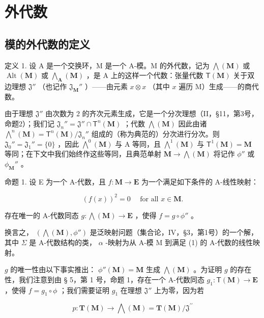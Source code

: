 \section{外代数}

\subsection{模的外代数的定义}

定义 1. 设 A 是一个交换环，M 是一个 A-模。M 的外代数，记为 \(\bigwedge (\mathbf{M})\) 或 \(\operatorname {Alt}(\mathbf{M})\) 或 \(\bigwedge_{\mathbf{A}}(\mathbf{M})\) ，是 A 上的这样一个代数：张量代数 \(\mathsf{T}(\mathbf{M})\) 关于双边理想 \(\mathfrak{J}''\) （也记作 \(\mathfrak{J}_{\mathbf{M}}''\) ）——由元素 \(x\otimes x\) （其中 \(x\) 遍历 M）生成——的商代数。

由于理想 \(\mathfrak{J}''\) 由次数为 2 的齐次元素生成，它是一个分次理想（II，§11，第3号，命题2）；我们记 \(\mathfrak{J}_n'' = \mathfrak{J}'' \cap \mathsf{T}^n(\mathbf{M})\) ；代数 \(\bigwedge(\mathbf{M})\) 因此由诸 \(\bigwedge^n(\mathbf{M}) = \mathsf{T}^n(\mathbf{M}) / \mathfrak{J}_n''\) 组成的（称为典范的）分次进行分次。则 \(\mathfrak{J}_0'' = \mathfrak{J}_1'' = \{0\}\) ，因此 \(\bigwedge^0(\mathbf{M})\) 与 A 等同，且 \(\bigwedge^1(\mathbf{M})\) 与 \(\mathsf{T}^1(\mathbf{M}) = \mathbf{M}\) 等同；在下文中我们始终作这些等同，且典范单射 \(\mathbf{M} \to \bigwedge(\mathbf{M})\) 将记作 \(\phi''\) 或 \(\phi_{\mathbf{M}}''\) 。

命题 1. 设 E 为一个 A-代数，且 \(f: \mathbf{M} \to \mathbf{E}\) 为一个满足如下条件的 A-线性映射：

\[
(f (x)) ^ {2} = 0 \quad \text { for all } x \in \mathbf {M}.\tag{1}
\]

存在唯一的 A-代数同态 \(g: \bigwedge(\mathbf{M}) \to \mathbf{E}\) ，使得 \(f = g \circ \phi''\) 。

换言之， \((\bigwedge (\mathbf{M}),\phi '')\) 是泛映射问题（集合论，IV，§3，第1号）的一个解，其中 \(\Sigma\) 是 A-代数结构的类， \(\alpha\) -映射为从 A-模 M 到满足 (1) 的 A-代数的线性映射。

\(g\) 的唯一性由以下事实推出： \(\phi''(\mathbf{M}) = \mathbf{M}\) 生成 \(\bigwedge (\mathbf{M})\) 。为证明 \(g\) 的存在性，我们注意到由 § 5，第 1 号，命题 1，存在一个 A-代数同态 \(g_1: \mathsf{T}(\mathbf{M}) \to \mathbf{E}\) ，使得 \(f = g_1 \circ \phi\) ；我们需要证明 \(g_1\) 在理想 \(\mathfrak{J}''\) 上为零，因为若

\[
p \colon \mathbf {T} (\mathbf {M}) \rightarrow \bigwedge (\mathbf {M}) = \mathbf {T} (\mathbf {M}) / \mathfrak {J} ^ {\prime \prime}
\]

